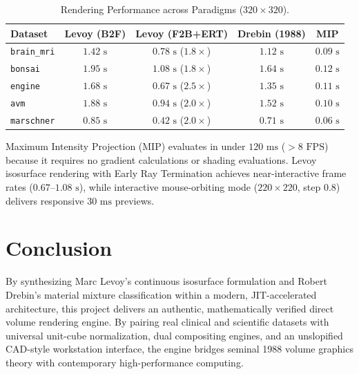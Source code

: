 \documentclass[10pt,twocolumn,a4paper]{article}
\begin{document}
\begin{table}[h]
\centering
\small
\caption{Rendering Performance across Paradigms ($320 \times 320$).}
\label{tab:benchmarks}
\begin{tabular}{@{}lcccc@{}}
\toprule
\textbf{Dataset} & \textbf{Levoy (B2F)} & \textbf{Levoy (F2B+ERT)} & \textbf{Drebin (1988)} & \textbf{MIP} \\ \midrule
\texttt{brain\_mri} & $1.42\text{ s}$ & $0.78\text{ s}$ ($1.8\times$) & $1.12\text{ s}$ & $0.09\text{ s}$ \\
\texttt{bonsai} & $1.95\text{ s}$ & $1.08\text{ s}$ ($1.8\times$) & $1.64\text{ s}$ & $0.12\text{ s}$ \\
\texttt{engine} & $1.68\text{ s}$ & $0.67\text{ s}$ ($2.5\times$) & $1.35\text{ s}$ & $0.11\text{ s}$ \\
\texttt{avm} & $1.88\text{ s}$ & $0.94\text{ s}$ ($2.0\times$) & $1.52\text{ s}$ & $0.10\text{ s}$ \\
\texttt{marschner} & $0.85\text{ s}$ & $0.42\text{ s}$ ($2.0\times$) & $0.71\text{ s}$ & $0.06\text{ s}$ \\ \bottomrule
\end{tabular}
\end{table}

Maximum Intensity Projection (MIP) evaluates in under $120\text{ ms}$ ($>8\text{ FPS}$) because it requires no gradient calculations or shading evaluations. Levoy isosurface rendering with Early Ray Termination achieves near-interactive frame rates ($0.67\text{--}1.08\text{ s}$), while interactive mouse-orbiting mode ($220 \times 220$, step $0.8$) delivers responsive $30\text{ ms}$ previews.

\section{Conclusion}
By synthesizing Marc Levoy's continuous isosurface formulation and Robert Drebin's material mixture classification within a modern, JIT-accelerated architecture, this project delivers an authentic, mathematically verified direct volume rendering engine. By pairing real clinical and scientific datasets with universal unit-cube normalization, dual compositing engines, and an unslopified CAD-style workstation interface, the engine bridges seminal 1988 volume graphics theory with contemporary high-performance computing.
\end{document}
